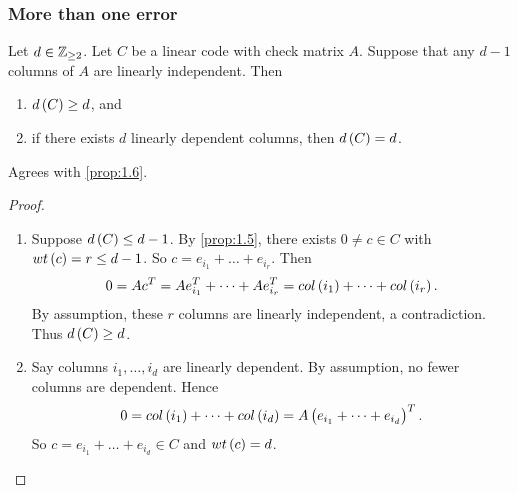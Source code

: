 \pagebreak

\subsubsection{More than one error}

\begin{proposition}
\label{prop:1.8}
Let $ d \in \mathbb{Z}_{\ge 2} $. Let $ C $ be a linear code with check matrix $ A $. Suppose that any $ d - 1 $ columns of $ A $ are linearly independent. Then
\begin{enumerate}
\item $ d\br{C} \ge d $, and
\item if there exists $ d $ linearly dependent columns, then $ d\br{C} = d $.
\end{enumerate}
\end{proposition}

\begin{note*}
Agrees with \ref{prop:1.6}.
\end{note*}

\begin{proof}
\hfill
\begin{enumerate}
\item Suppose $ d\br{C} \le d - 1 $. By \ref{prop:1.5}, there exists $ 0 \ne c \in C $ with $ wt\br{c} = r \le d - 1 $. So $ c = e_{i_1} + \dots + e_{i_r} $. Then
$$ 0 = Ac^T = Ae_{i_1}^T + \dots + Ae_{i_r}^T = col\br{i_1} + \dots + col\br{i_r}. $$
By assumption, these $ r $ columns are linearly independent, a contradiction. Thus $ d\br{C} \ge d $.
\item Say columns $ i_1, \dots, i_d $ are linearly dependent. By assumption, no fewer columns are dependent. Hence
$$ 0 = col\br{i_1} + \dots + col\br{i_d} = A\br{e_{i_1} + \dots + e_{i_d}}^T. $$
So $ c = e_{i_1} + \dots + e_{i_d} \in C $ and $ wt\br{c} = d $.
\end{enumerate}
\end{proof}

